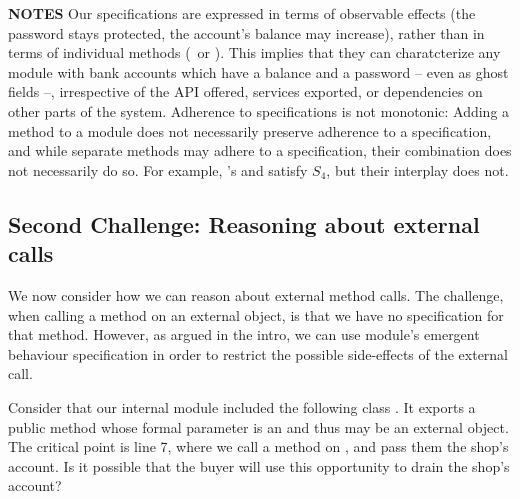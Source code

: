  
 \noindent
\textbf{NOTES} \notesep  Our specifications are expressed in terms of observable effects (\eg the password stays protected, the account's balance may increase), rather than in terms of individual methods (\eg\,  or ).
{This %
implies that they can charatcterize  any 
module with bank accounts which have a %
 balance and a password -- even as ghost fields --}, irrespective of the API offered, services  exported, or  dependencies on other parts of the system.
\notesep
{Adherence to   specifications is not monotonic:
Adding a method to a module does not necessarily preserve adherence to
a specification, and while separate methods may adhere to a  specification, their combination does
not necessarily do so. 
{For example, \ModB's   and  satisfy $S_4$, but their interplay does not.}
}

 
\subsection{Second Challenge: Reasoning about external calls}
\label{sec:how}

{We now consider how we can reason about external method calls. 
The challenge, when calling a method on an external object, is that we have no specification for that method. 
However, as argued in the intro, we can use  module's emergent behaviour  specification   in order to restrict the possible side-effects of the external call.
}

 
 
Consider that {our internal module included the following class} . It exports a public method  whose formal parameter  is an  and thus may be an external object. 
The critical point is line 7, where we call a method on , and pass them the shop's account.
Is it possible that the buyer will use this opportunity  to drain the shop's account?
 




%
 

